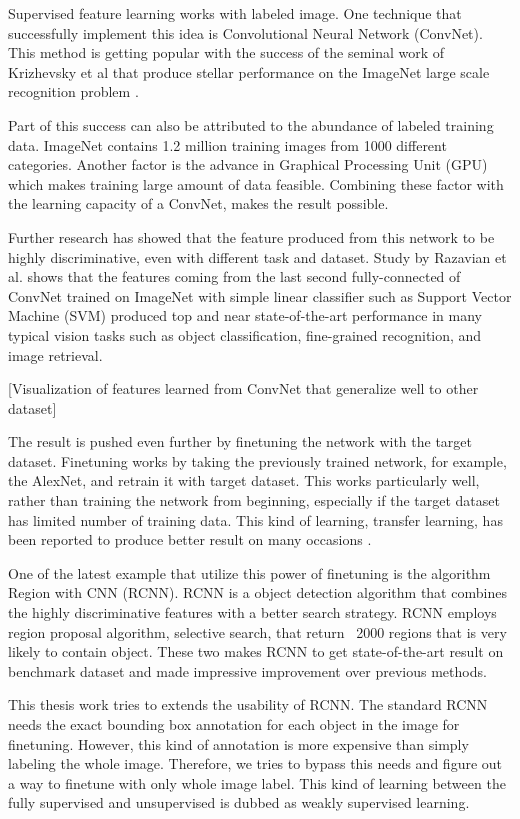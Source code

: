 \documentclass[a4paper,11pt]{kth-mag}
\begin{document}
Supervised feature learning works with labeled image. One technique that successfully implement this idea is Convolutional Neural Network (ConvNet). This method is getting popular with the success of the seminal work of Krizhevsky et al that produce stellar performance on the ImageNet large scale recognition problem \cite{krizhevsky2012}. 

Part of this success can also be attributed to the abundance of labeled training data. ImageNet contains 1.2 million training images from 1000 different categories. Another factor is the advance in Graphical Processing Unit (GPU) which makes training large amount of data feasible. Combining these factor with the learning capacity of a ConvNet, makes the result possible.

Further research has showed that the feature produced from this network to be highly discriminative, even with different task and dataset. Study by Razavian et al. \cite{razavian2014} shows that the features coming from the last second fully-connected of ConvNet trained on ImageNet with simple linear classifier such as Support Vector Machine (SVM) produced top and near state-of-the-art performance in many typical vision tasks such as object classification, fine-grained recognition, and image retrieval. 

[Visualization of features learned from ConvNet that generalize well to other dataset]

The result is pushed even further by finetuning the network with the target dataset. Finetuning works by taking the previously trained network, for example, the AlexNet, and retrain it with target dataset. This works particularly well, rather than training the network from beginning, especially if the target dataset has limited number of training data. This kind of learning, transfer learning, has been reported to produce better result on many occasions \cite{azizpour2014}.

One of the latest example that utilize this power of finetuning is the algorithm Region with CNN (RCNN). RCNN is a object detection algorithm that combines the highly discriminative features with a better search strategy. RCNN employs region proposal algorithm, selective search, that return ~2000 regions that is very likely to contain object. These two makes RCNN to get state-of-the-art result on benchmark dataset and made impressive improvement over previous methods.

This thesis work tries to extends the usability of RCNN. The standard RCNN needs the exact bounding box annotation for each object in the image for finetuning. However, this kind of annotation is more expensive than simply labeling the whole image. Therefore, we tries to bypass this needs and figure out a way to finetune with only whole image label. This kind of learning between the fully supervised and unsupervised is dubbed as weakly supervised learning.
\end{document}
